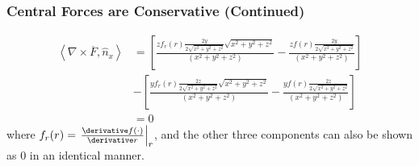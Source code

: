 \begin{frame}
\frametitle{Central Forces are Conservative (Continued)}
\begin{align*}\left<\nabla\times\overline{F},\hat n_x\right>&=\left[\frac{zf_r(r)\frac{2y}{2\sqrt{x^2+y^2+z^2}}\sqrt{x^2+y^2+z^2}}{(x^2+y^2+z^2)}-\frac{zf(r)\frac{2y}{2\sqrt{x^2+y^2+z^2}}}{(x^2+y^2+z^2)}\right]\\&-\left[\frac{yf_r(r)\frac{2z}{2\sqrt{x^2+y^2+z^2}}\sqrt{x^2+y^2+z^2}}{(x^2+y^2+z^2)}-\frac{yf(r)\frac{2z}{2\sqrt{x^2+y^2+z^2}}}{(x^2+y^2+z^2)}\right]\\
&=0
\end{align*}
where $f_r(r)=\left.\frac{\derivative f(\cdot)}{\derivative r}\right|_{r}$, and the other three components can also be shown as $0$ in an identical manner.
\end{frame}
